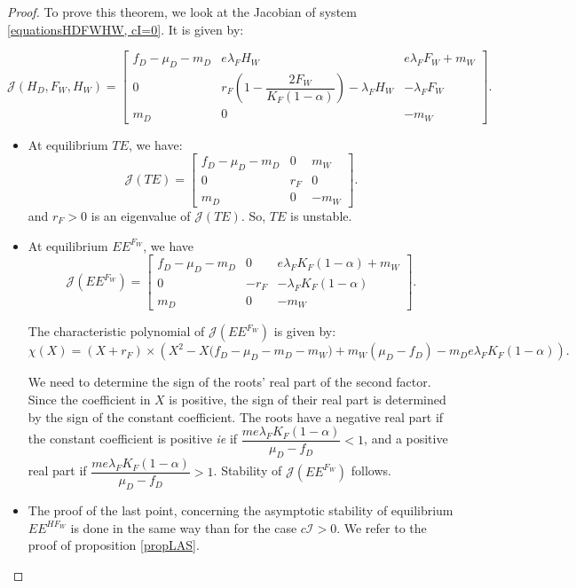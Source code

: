 \documentclass{article}
\newcommand{\lfw}{\lambda_{F}}
\newcommand{\lfw}{\lambda_{F}}
\newcommand{\cI}{c \mathcal{I}}
\begin{document}
\begin{proof}
To prove this theorem, we look at the Jacobian of system \eqref{equationsHDFWHW, cI=0}. It is given by:

\begin{equation*}
\mathcal{J}(H_D, F_W, H_W) = \begin{bmatrix}
f_D-\mu_D - m_D & e \lfw H_W & e\lfw F_W + m_W \\
0 & r_F \left( 1 - \dfrac{2F_W}{K_F(1-\alpha)} \right) - \lfw H_W & - \lfw F_W \\
m_D & 0 & -m_W
\end{bmatrix}.
\end{equation*}

\begin{itemize}
\item At equilibrium $TE$, we have:
\begin{equation*}
\mathcal{J}(TE) = \begin{bmatrix}
f_D-\mu_D - m_D & 0 &  m_W \\
0 & r_F  &  0\\
m_D & 0 & -m_W
\end{bmatrix}.
\end{equation*}
and $r_F > 0$ is an eigenvalue of $\mathcal{J}(TE)$. So, $TE$ is unstable.
\item At equilibrium $EE^{F_W}$, we have
\begin{equation*}
\mathcal{J}(EE^{F_W}) = \begin{bmatrix}
f_D-\mu_D - m_D & 0 & e\lfw K_F(1-\alpha) + m_W \\
0 & -r_F  & -\lfw K_F(1-\alpha)  \\
m_D & 0 & -m_W
\end{bmatrix}.
\end{equation*}

The characteristic polynomial of $\mathcal{J}(EE^{F_W})$ is given by:
\begin{equation*}
\chi(X) = (X +r_F) \times \left(X^2 - X\Big(f_D - \mu_D - m_D - m_W \Big) + m_W(\mu_D - f_D) - m_D e \lfw K_F(1-\alpha) \right).
\end{equation*}

We need to determine the sign of the roots' real part of the second factor. Since the coefficient in $X$ is positive, the sign of their real part is determined by the sign of the constant coefficient.
The roots have a negative real part if the constant coefficient is positive \textit{ie} if $\dfrac{m e \lfw K_F(1-\alpha)}{\mu_D - f_D} < 1 $, and a positive real part if $\dfrac{m e \lfw K_F(1-\alpha)}{\mu_D - f_D} > 1 $. Stability of $\mathcal{J}(EE^{F_W})$ follows.
\item The proof of the last point, concerning the asymptotic stability of equilibrium $EE^{HF_W}$ is done in the same way than for the case $\cI > 0$. We refer to the proof of proposition \ref{propLAS}.
\end{itemize}
\end{proof}
\end{document}
